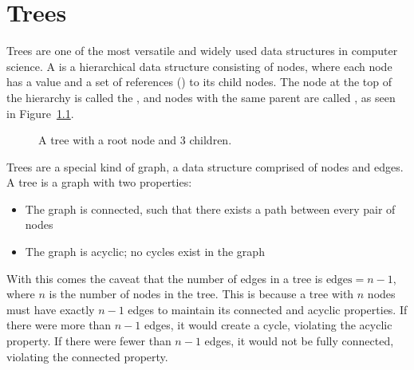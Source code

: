 \chapter{Trees}




Trees are one of the most versatile and widely used data structures in computer science. A  is a hierarchical data structure consisting of nodes, where each node has a value and a set of references () to its child nodes. The node at the top of the hierarchy is called the , and nodes with the same parent are called , as seen in Figure~\ref{fig:tree1}.\\
\begin{figure}
  \centering
  \caption{A tree with a root node and 3 children.}
  \label{fig:tree1}
\end{figure}
Trees are a special kind of graph, a data structure comprised of nodes and edges. A tree is a graph with two properties:
\begin{itemize}
  \item The graph is connected, such that there exists a path between every pair of nodes
  \item The graph is acyclic; no cycles exist in the graph
\end{itemize}
With this comes the caveat that the number of edges in a tree is $\text{edges} = n - 1$, where $n$ is the number of nodes in the tree. This is because a tree with $n$ nodes must have exactly $n-1$ edges to maintain its connected and acyclic properties. If there were more than $n-1$ edges, it would create a cycle, violating the acyclic property. If there were fewer than $n-1$ edges, it would not be fully connected, violating the connected property.

